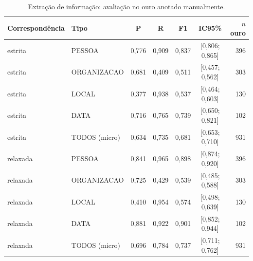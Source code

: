 \begin{table}[t]\centering\scriptsize
\caption{Extração de informação: avaliação no ouro anotado manualmente.}\label{tab:ieeval}
\begin{tabular}{llccccr}
\toprule
Correspondência & Tipo & P & R & F1 & IC95\% & $n$ ouro \\
\midrule
estrita & PESSOA & 0,776 & 0,909 & 0,837 & [0,806; 0,865] & 396 \\
estrita & ORGANIZACAO & 0,681 & 0,409 & 0,511 & [0,457; 0,562] & 303 \\
estrita & LOCAL & 0,377 & 0,938 & 0,537 & [0,464; 0,603] & 130 \\
estrita & DATA & 0,716 & 0,765 & 0,739 & [0,650; 0,821] & 102 \\
estrita & TODOS (micro) & 0,634 & 0,735 & 0,681 & [0,653; 0,710] & 931 \\
relaxada & PESSOA & 0,841 & 0,965 & 0,898 & [0,874; 0,920] & 396 \\
relaxada & ORGANIZACAO & 0,725 & 0,429 & 0,539 & [0,485; 0,588] & 303 \\
relaxada & LOCAL & 0,410 & 0,954 & 0,574 & [0,498; 0,639] & 130 \\
relaxada & DATA & 0,881 & 0,922 & 0,901 & [0,852; 0,944] & 102 \\
relaxada & TODOS (micro) & 0,696 & 0,784 & 0,737 & [0,711; 0,762] & 931 \\
\bottomrule
\end{tabular}\par{}
\end{table}

